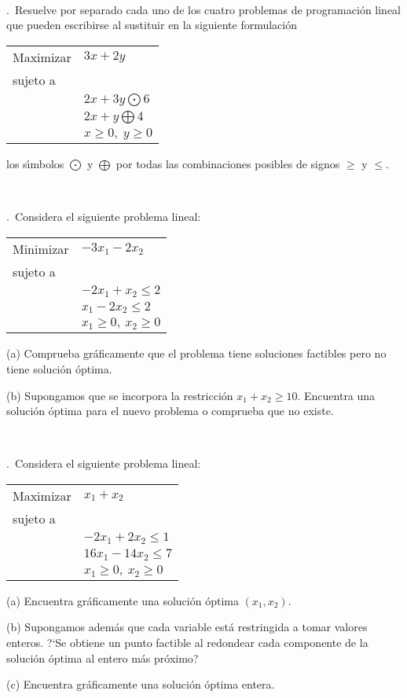 \documentclass[11pt,a4paper,twoside]{article}
\newcounter{problem} \setcounter{problem}{1}
\newcommand{\ex}{\noindent {\sf \bf \theproblem}\addtocounter{problem}{1}.\ }
\begin{document}
 \
 
 \ex Resuelve por separado cada uno de los cuatro problemas de
programaci\'on lineal que pueden escribirse al sustituir en la siguiente
formulaci\'on

\begin{tabular}{ll}
Maximizar & $3x + 2y$ \\
sujeto a  & \\
& $ 2x + 3y \bigodot 6  $\\
& $ 2x +  y \bigoplus 4  $\\
& $ x \ge 0,\; y\ge 0 $
\end{tabular}

los s\'{\i}mbolos $\bigodot$ y $\bigoplus$ por todas las combinaciones
posibles de signos $\ge$ y $\le$.

\

\ex Considera el siguiente problema  lineal:

\begin{tabular}{ll}
Minimizar & $-3x_1-2x_2$ \\
sujeto a & \\
&$-2x_1+x_2\leq 2$\\
&$x_1-2x_2\leq 2$\\
&$x_1\geq 0,\ x_2\geq 0$
\end{tabular}

\begin{compactitem}
\item[(a)] Comprueba gr\'aficamente que el problema tiene soluciones factibles
pero no tiene soluci\'on \'optima.
\item[(b)]  Supongamos que se incorpora la restricci\'on
$
x_1 + x_ 2 \ge 10.
$
Encuentra una soluci\'on \'optima para el nuevo problema o comprueba que no existe.
\end{compactitem}

\

\ex Considera el siguiente problema  lineal:

\begin{tabular}{ll}
Maximizar & $x_1+x_2$ \\
sujeto a & \\
&$-2x_1+2x_2\leq 1$\\
&$16x_1-14x_2\leq 7$\\
&$x_1\geq 0,\ x_2\geq 0$
\end{tabular}


\begin{compactitem}
\item[(a)] Encuentra gr\'aficamente una soluci\'on \'optima $(x_1,x_2)$.
\item[(b)] Supongamos adem\'as que cada variable est\'a restringida a
tomar valores enteros. ?`Se obtiene un punto factible al redondear
cada componente de la soluci\'on \'optima al entero m\'as pr\'oximo?
\item[(c)] Encuentra gr\'aficamente una soluci\'on \'optima entera.
\end{compactitem}
\end{document}
